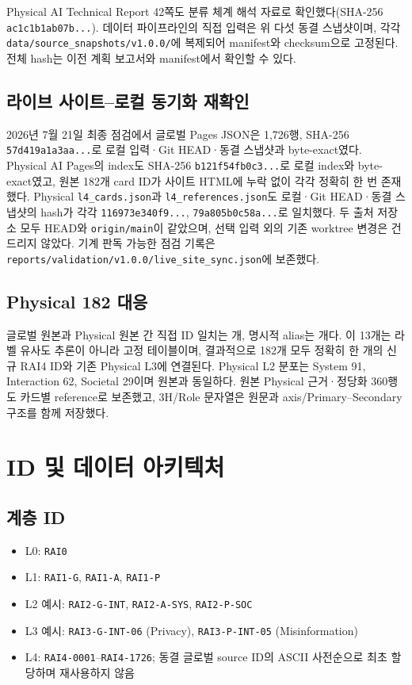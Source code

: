 \documentclass[11pt,a4paper]{article}
\newcommand{\code}[1]{\texttt{#1}}
\begin{document}
Physical AI Technical Report 42쪽도 분류 체계 해석 자료로 확인했다(SHA-256 \code{ac1c1b1ab07b...}). 데이터 파이프라인의 직접 입력은 위 다섯 동결 스냅샷이며, 각각 \code{data/source\_snapshots/v1.0.0/}에 복제되어 manifest와 checksum으로 고정된다. 전체 hash는 이전 계획 보고서와 manifest에서 확인할 수 있다.

\subsection{라이브 사이트--로컬 동기화 재확인}

2026년 7월 21일 최종 점검에서 글로벌 Pages JSON은 1,726행, SHA-256 \code{57d419a1a3aa...}로 로컬 입력·Git HEAD·동결 스냅샷과 byte-exact였다. Physical AI Pages의 index도 SHA-256 \code{b121f54fb0c3...}로 로컬 index와 byte-exact였고, 원본 182개 card ID가 사이트 HTML에 누락 없이 각각 정확히 한 번 존재했다. Physical \code{l4\_cards.json}과 \code{l4\_references.json}도 로컬·Git HEAD·동결 스냅샷의 hash가 각각 \code{116973e340f9...}, \code{79a805b0c58a...}로 일치했다. 두 출처 저장소 모두 HEAD와 \code{origin/main}이 같았으며, 선택 입력 외의 기존 worktree 변경은 건드리지 않았다. 기계 판독 가능한 점검 기록은 \nolinkurl{reports/validation/v1.0.0/live_site_sync.json}에 보존했다.

\subsection{Physical 182 대응}

글로벌 원본과 Physical 원본 간 직접 ID 일치는 \ExactMatches{}개, 명시적 alias는 \ExplicitAliases{}개다. 이 13개는 라벨 유사도 추론이 아니라 고정 테이블이며, 결과적으로 182개 모두 정확히 한 개의 신규 RAI4 ID와 기존 Physical L3에 연결된다. Physical L2 분포는 System 91, Interaction 62, Societal 29이며 원본과 동일하다. 원본 Physical 근거·정당화 360행도 카드별 reference로 보존했고, 3H/Role 문자열은 원문과 axis/Primary--Secondary 구조를 함께 저장했다.

\section{ID 및 데이터 아키텍처}

\subsection{계층 ID}

\begin{itemize}
  \item L0: \code{RAI0}
  \item L1: \code{RAI1-G}, \code{RAI1-A}, \code{RAI1-P}
  \item L2 예시: \code{RAI2-G-INT}, \code{RAI2-A-SYS}, \code{RAI2-P-SOC}
  \item L3 예시: \code{RAI3-G-INT-06} (Privacy), \code{RAI3-P-INT-05} (Misinformation)
  \item L4: \code{RAI4-0001}--\code{RAI4-1726}; 동결 글로벌 source ID의 ASCII 사전순으로 최초 할당하며 재사용하지 않음
\end{itemize}
\end{document}
